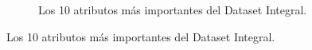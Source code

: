\begin{figure}[H]
\begin{subfigure}[b]{0.9\textwidth}
    \caption{Los 10 atributos más importantes del Dataset Integral.}
    \label{fig:importances_integral_varq}
\end{subfigure}
\end{figure}






